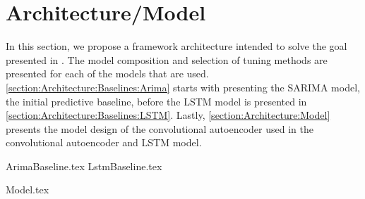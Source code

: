 \chapter{Architecture/Model}
\label{section:Architecture}

In this section, we propose a framework architecture intended to solve the goal presented in .
The model composition and selection of tuning methods are presented for each of the models that are used.
\cref{section:Architecture:Baselines:Arima} starts with presenting the SARIMA model, the initial predictive baseline,
before the LSTM model is presented in \cref{section:Architecture:Baselines:LSTM}.
Lastly, \cref{section:Architecture:Model} presents the model design of the convolutional autoencoder used in the 
convolutional autoencoder and LSTM model.


{ArimaBaseline.tex}
{LstmBaseline.tex}

{Model.tex}
